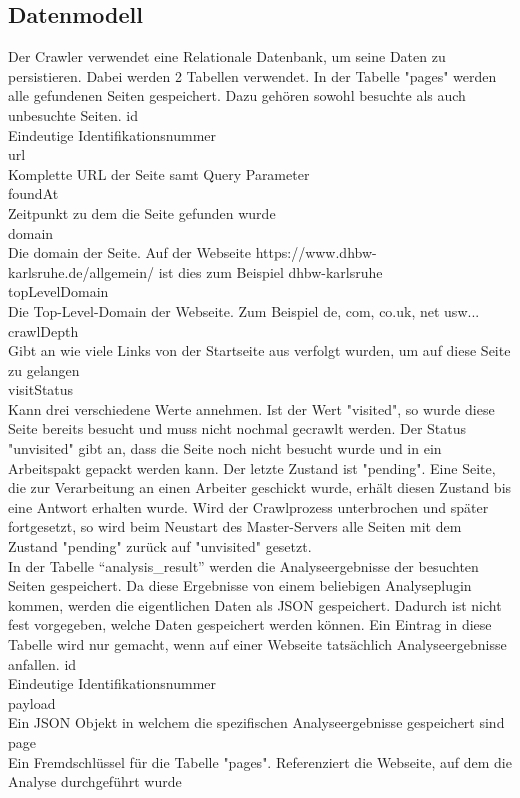 \subsection{Datenmodell}
Der Crawler verwendet eine Relationale Datenbank, um seine Daten zu persistieren. Dabei werden 2 Tabellen verwendet. In der Tabelle "pages" werden alle gefundenen Seiten gespeichert. Dazu gehören sowohl besuchte als auch unbesuchte Seiten.
id \\
Eindeutige Identifikationsnummer \\
url \\
Komplette URL der Seite samt Query Parameter \\
foundAt \\
Zeitpunkt zu dem die Seite gefunden wurde \\
domain \\
Die domain der Seite. Auf der Webseite https://www.dhbw-karlsruhe.de/allgemein/ ist dies zum Beispiel dhbw-karlsruhe \\
topLevelDomain \\
Die Top-Level-Domain der Webseite. Zum Beispiel de, com, co.uk, net usw... \\
crawlDepth \\
Gibt an wie viele Links von der Startseite aus verfolgt wurden, um auf diese Seite zu gelangen \\
visitStatus \\
Kann drei verschiedene Werte annehmen. Ist der Wert "visited", so wurde diese Seite bereits besucht und muss nicht nochmal gecrawlt werden. Der Status "unvisited" gibt an, dass die Seite noch nicht besucht wurde und in ein Arbeitspakt gepackt werden kann. Der letzte Zustand ist "pending". Eine Seite, die zur Verarbeitung an einen Arbeiter geschickt wurde, erhält diesen Zustand bis eine Antwort erhalten wurde. Wird der Crawlprozess unterbrochen und später fortgesetzt, so wird beim Neustart des Master-Servers alle Seiten mit dem Zustand "pending" zurück auf "unvisited" gesetzt.\\

In der Tabelle "`analysis\_result"' werden die Analyseergebnisse der besuchten Seiten gespeichert. Da diese Ergebnisse von einem beliebigen Analyseplugin kommen, werden die eigentlichen Daten als JSON gespeichert. Dadurch ist nicht fest vorgegeben, welche Daten gespeichert werden können. Ein Eintrag in diese Tabelle wird nur gemacht, wenn auf einer Webseite tatsächlich Analyseergebnisse anfallen.
id \\
Eindeutige Identifikationsnummer \\
payload \\
Ein JSON Objekt in welchem die spezifischen Analyseergebnisse gespeichert sind \\
page \\
Ein Fremdschlüssel für die Tabelle "pages". Referenziert die Webseite, auf dem die Analyse durchgeführt wurde \\

